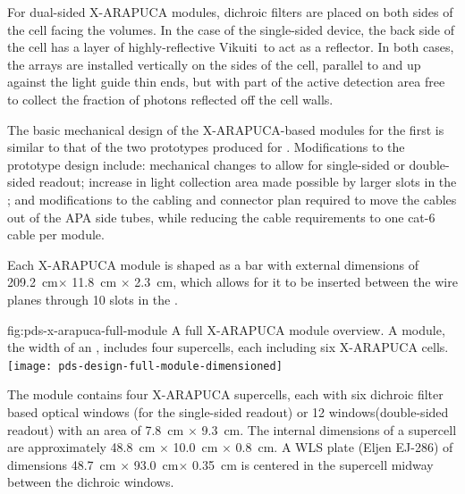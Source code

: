For dual-sided X-ARAPUCA modules, dichroic filters are placed on both sides of the %
cell facing the \lar volumes.  In the case of the single-sided device, the back side of the cell  %
has a layer of highly-reflective Vikuiti\texttrademark\ to act as %
a  reflector.  In both cases, the  arrays are installed vertically on the sides of the cell, parallel to and up against the light guide thin ends, but with part of the active detection area free to collect the fraction of photons reflected off the cell walls. 


The basic mechanical design of the X-ARAPUCA-based  modules for the first  is similar to that of the two prototypes produced for . Modifications to the prototype design include:  mechanical changes to allow for single-sided or double-sided readout; increase in light collection area made possible by larger slots in the ; and modifications to the cabling and connector plan required to move the  cables out of the APA side tubes, while reducing the cable requirements to one cat-6 cable per  module.


Each X-ARAPUCA module is shaped as a bar with external dimensions of \SI{209.2}{cm}$ \times$ \SI{11.8}{cm} $\times$ \SI{2.3}{cm}, which allows for it to be inserted between the wire planes through 10 slots in the . 


\begin{dunefigure}
{fig:pds-x-arapuca-full-module}
{A full X-ARAPUCA module overview. A module, the width of an , includes four supercells, each including six X-ARAPUCA cells. }
   \texttt{[image: pds-design-full-module-dimensioned]}
\end{dunefigure}

The module contains four X-ARAPUCA supercells, each with six dichroic filter based optical windows (for the single-sided readout) or 12 windows(double-sided readout) with an area of \SI{7.8}{cm} $\times$ \SI{9.3}{cm}.  The internal dimensions of  a supercell are approximately \SI{48.8}{cm} $\times$ \SI{10.0}{cm} $\times$ \SI{0.8}{cm}. A WLS plate (Eljen EJ-286) of dimensions \SI{48.7}{cm} $\times$ \SI{93.0}{cm}$\times$ \SI{0.35}{cm} is centered in the supercell midway between the dichroic windows.  
 
